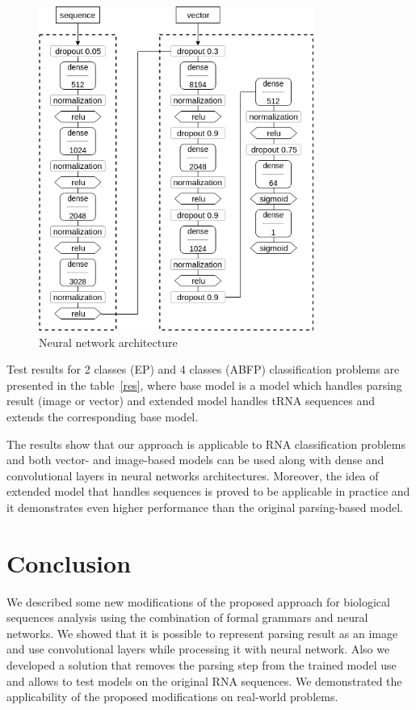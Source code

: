 \documentclass[12pt,a4paper]{cibb}
\begin{document}
\begin{figure}[h]
\begin{center}
\centering
\includegraphics[width=9cm]{nn.png}
\caption{Neural network architecture}
\label{nn}
\end{center}
\end{figure}   

Test results for 2 classes (EP) and 4 classes (ABFP) classification problems are presented in the table~\ref{res}, where base model is a model which handles parsing result (image or vector) and extended model handles tRNA sequences and extends the corresponding base model.


The results show that our approach is applicable to RNA classification problems and both vector- and image-based models can be used along with dense and convolutional layers in neural networks architectures. Moreover, the idea of extended model that handles sequences is proved to be applicable in practice and it demonstrates even higher performance than the original parsing-based model.



\section{\bf Conclusion}
We described some new modifications of the proposed approach for biological sequences analysis using the combination of formal grammars and neural networks. We showed that it is possible to represent parsing result as an image and use convolutional layers while processing it with neural network. Also we developed a solution that removes the parsing step from the trained model use and allows to test models on the original RNA sequences. We demonstrated the applicability of the proposed modifications on real-world problems.
\end{document}
